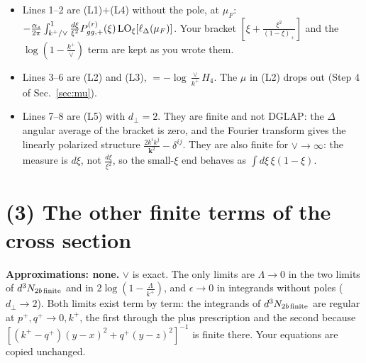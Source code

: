 \documentclass[10pt]{article}
\numberwithin{equation}{section}
\begin{document}
\begin{itemize}
\item Lines 1--2 are (L1)$+$(L4) without the pole, at $\mu_F$: $-\frac{\alpha_s}{2\pi}\int_{k^+/\vee}^1\frac{d\xi}{\xi^2}P^{(r)}_{gg,+}(\xi)\,{\rm LO}_\xi[\ell_\Delta(\mu_F)]$. Your bracket $[\xi+\frac{\xi^2}{(1-\xi)_+}]$ and the $\log(1-\frac{k^+}{\vee})$ term are kept as you wrote them.
\item Lines 3--6 are (L2) and (L3), $=-\log\frac{\vee}{k^+}H_4$. The $\mu$ in (L2) drops out (Step 4 of Sec.~\ref{sec:mu}).
\item Lines 7--8 are (L5) with $d_\perp=2$. They are finite and not DGLAP: the $\Delta$ angular average of the bracket is zero, and the Fourier transform gives the linearly polarized structure $\frac{2k^ik^j}{\mathbf k^2}-\delta^{ij}$. They are also finite for $\vee\to\infty$: the measure is $d\xi$, not $\frac{d\xi}{\xi^2}$, so the small-$\xi$ end behaves as $\int d\xi\,\xi(1-\xi)$.
\end{itemize}

\section{(3) The other finite terms of the cross section}\label{sec:fin}
\textbf{Approximations: none.} $\vee$ is exact. The only limits are $\Lambda\to0$ in the two limits of $d^3N_{2b\,\rm finite}$ and in $2\log(1-\frac{\Lambda}{k^+})$, and $\epsilon\to0$ in integrands without poles ($d_\perp\to2$). Both limits exist term by term: the integrands of $d^3N_{2b\,\rm finite}$ are regular at $p^+,q^+\to0,k^+$, the first through the plus prescription and the second because $[(k^+-q^+)(y-x)^2+q^+(y-z)^2]^{-1}$ is finite there. Your equations are copied unchanged.
\end{document}
